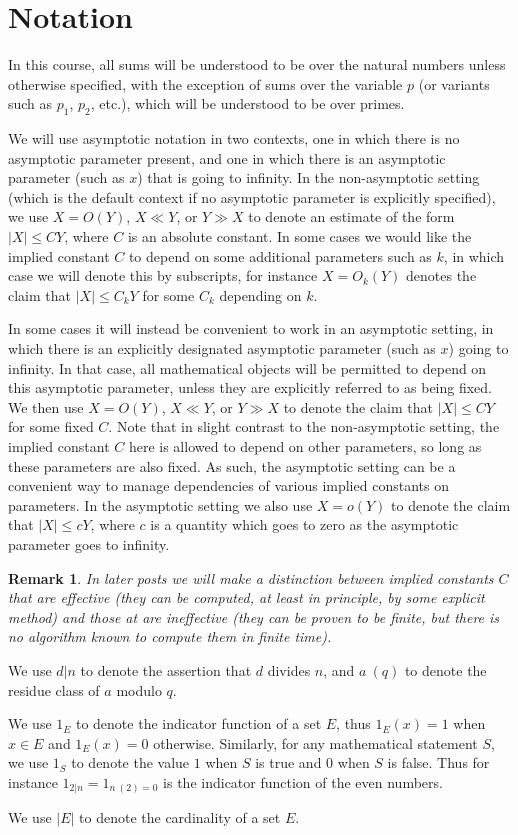 \documentclass[10pt,reqno]{amsart}
\newtheorem{remark}[theorem]{Remark}
\begin{document}
\section{Notation}

In this course, all sums will be understood to be over the natural numbers unless otherwise specified, with the exception of sums over the variable $p$ (or variants such as $p_1$, $p_2$, etc.), which will be understood to be over primes.

We will use asymptotic notation in two contexts, one in which there is no asymptotic parameter present, and one in which there is an asymptotic parameter (such as $x$) that is going to infinity. In the non-asymptotic setting (which is the default context if no asymptotic parameter is explicitly specified), we use $X = O(Y)$, $X \ll Y$, or $Y \gg X$ to denote an estimate of the form $|X| \leq CY$, where $C$ is an absolute constant. In some cases we would like the implied constant $C$ to depend on some additional parameters such as $k$, in which case we will denote this by subscripts, for instance $X = O_k(Y)$ denotes the claim that $|X| \leq C_k Y$ for some $C_k$ depending on $k$.

In some cases it will instead be convenient to work in an asymptotic setting, in which there is an explicitly designated asymptotic parameter (such as $x$) going to infinity. In that case, all mathematical objects will be permitted to depend on this asymptotic parameter, unless they are explicitly referred to as being fixed. We then use $X = O(Y)$, $X \ll Y$, or $Y \gg X$ to denote the claim that $|X| \leq CY$ for some fixed $C$. Note that in slight contrast to the non-asymptotic setting, the implied constant $C$ here is allowed to depend on other parameters, so long as these parameters are also fixed. As such, the asymptotic setting can be a convenient way to manage dependencies of various implied constants on parameters. In the asymptotic setting we also use $X = o(Y)$ to denote the claim that $|X| \leq c Y$, where $c$ is a quantity which goes to zero as the asymptotic parameter goes to infinity.

\begin{remark}
    In later posts we will make a distinction between implied constants $C$ that are effective (they can be computed, at least in principle, by some explicit method) and those at are ineffective (they can be proven to be finite, but there is no algorithm known to compute them in finite time).
\end{remark}

We use $d|n$ to denote the assertion that $d$ divides $n$, and $a\ (q)$ to denote the residue class of $a$ modulo $q$.

We use $1_E$ to denote the indicator function of a set $E$, thus $1_E(x) = 1$ when $x \in E$ and $1_E(x) = 0$ otherwise. Similarly, for any mathematical statement $S$, we use $1_S$ to denote the value $1$ when $S$ is true and $0$ when $S$ is false. Thus for instance $1_{2|n} = 1_{n\ (2) = 0}$ is the indicator function of the even numbers.

We use $|E|$ to denote the cardinality of a set $E$.
\end{document}
